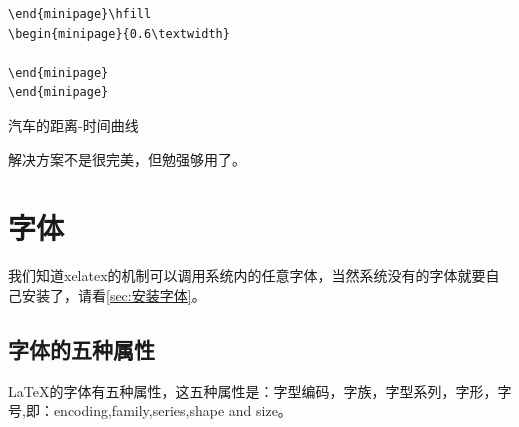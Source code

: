 \documentclass[12pt,oneside]{book}
\begin{document}
\begin{common-format}
\begin{Verbatim}
\end{minipage}\hfill
\begin{minipage}{0.6\textwidth}

\end{minipage} 
\end{minipage} 
\end{Verbatim}


\noindent
\begin{minipage}{\textwidth}
\begin{minipage}{0.3\textwidth}
\begin{table}[H]
\centering
\medskip 
{}
\caption*{表 2-1}
\end{table}

\end{minipage}\hfill
\begin{minipage}{0.7\textwidth}
\begin{linefig}[0.9]{汽车的距离-时间曲线}
\caption{汽车的距离-时间曲线}
\label{fig:汽车的距离-时间曲线}
\end{linefig}
\end{minipage} 
\end{minipage} 

解决方案不是很完美，但勉强够用了。





\section{字体}
我们知道xelatex的机制可以调用系统内的任意字体，当然系统没有的字体就要自己安装了，请看\ref{sec:安装字体}。

\subsection{字体的五种属性}
\LaTeX 的字体有五种属性，这五种属性是：字型编码，字族，字型系列，字形，字号,即：encoding,family,series,shape and size。


\end{common-format}
\end{document}
